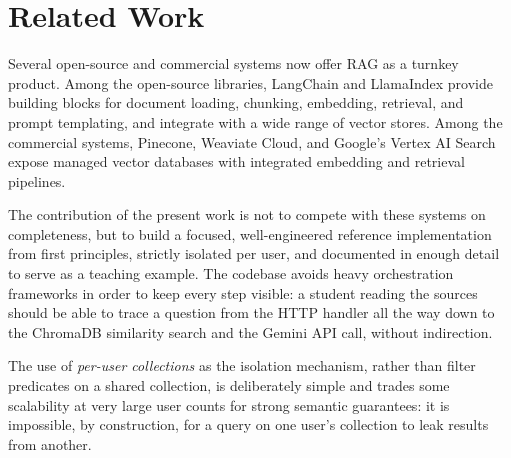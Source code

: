 \section{Related Work}
\label{sec:related-work}

Several open-source and commercial systems now offer RAG as a turnkey
product. Among the open-source libraries, LangChain and LlamaIndex provide
building blocks for document loading, chunking, embedding, retrieval, and
prompt templating, and integrate with a wide range of vector stores. Among
the commercial systems, Pinecone, Weaviate Cloud, and Google's Vertex AI
Search expose managed vector databases with integrated embedding and
retrieval pipelines.

The contribution of the present work is not to compete with these systems
on completeness, but to build a focused, well-engineered reference
implementation from first principles, strictly isolated per user, and
documented in enough detail to serve as a teaching example. The codebase
avoids heavy orchestration frameworks in order to keep every step visible:
a student reading the sources should be able to trace a question from the
HTTP handler all the way down to the ChromaDB similarity search and the
Gemini API call, without indirection.

The use of \emph{per-user collections} as the isolation mechanism, rather
than filter predicates on a shared collection, is deliberately simple and
trades some scalability at very large user counts for strong semantic
guarantees: it is impossible, by construction, for a query on one user's
collection to leak results from another.
